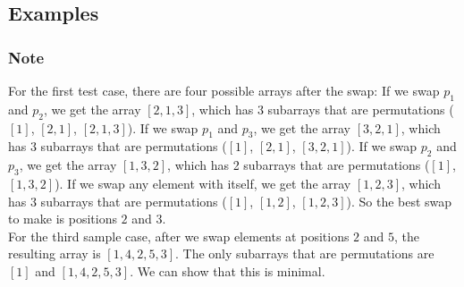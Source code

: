 \documentclass{article}
\begin{document}
\subsection*{Examples}
\subsubsection*{Note}For the first test case, there are four possible arrays after the swap:   If we swap $p_1$ and $p_2$, we get the array $[2, 1, 3]$, which has 3 subarrays that are permutations ($[1]$, $[2, 1]$, $[2, 1, 3]$).  If we swap $p_1$ and $p_3$, we get the array $[3, 2, 1]$, which has 3 subarrays that are permutations ($[1]$, $[2, 1]$, $[3, 2, 1]$).  If we swap $p_2$ and $p_3$, we get the array $[1, 3, 2]$, which has 2 subarrays that are permutations ($[1]$, $[1, 3, 2]$).  If we swap any element with itself, we get the array $[1, 2, 3]$, which has 3 subarrays that are permutations ($[1]$, $[1, 2]$, $[1, 2, 3]$).  So the best swap to make is positions $2$ and $3$.\\ For the third sample case, after we swap elements at positions $2$ and $5$, the resulting array is $[1, 4, 2, 5, 3]$. The only subarrays that are permutations are $[1]$ and $[1, 4, 2, 5, 3]$. We can show that this is minimal.
\newpage
\end{document}
